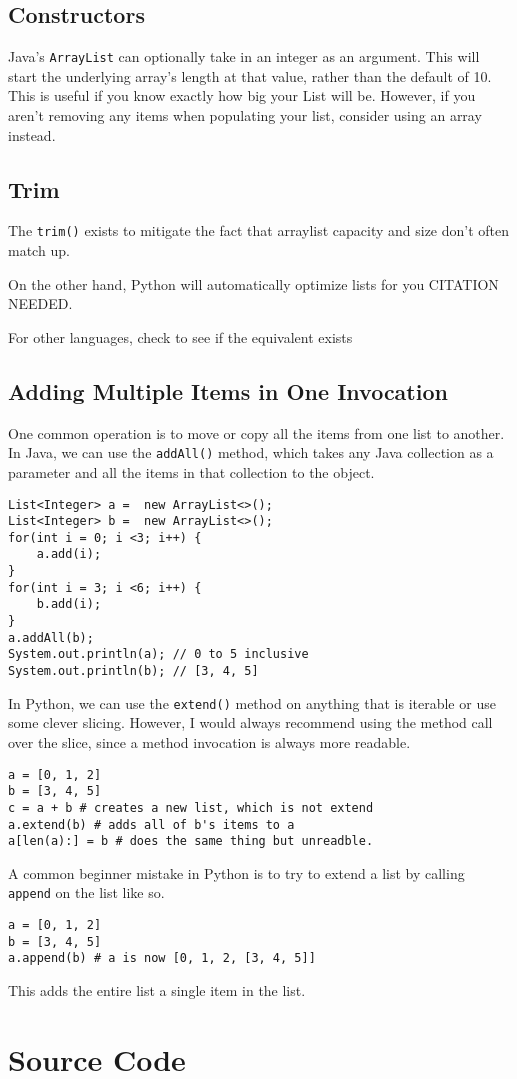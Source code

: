 
\subsection{Constructors}
Java's \texttt{ArrayList} can optionally take in an integer as an argument.
This will start the underlying array's length at that value, rather than the default of 10.
This is useful if you know exactly how big your List will be.  
However, if you aren't removing any items when populating your list, consider using an array instead.

\subsection{Trim}

The \texttt{trim()} exists to mitigate the fact that arraylist capacity and size don't often match up.



On the other hand, Python will automatically optimize lists for you CITATION NEEDED.

For other languages, check to see if the equivalent exists

\subsection{Adding Multiple Items in One Invocation}
One common operation is to move or copy all the items from one list to another.
In Java, we can use the \texttt{addAll()} method, which takes any Java collection as a parameter and all the items in that collection to the object.

\begin{verbatim}
List<Integer> a =  new ArrayList<>();
List<Integer> b =  new ArrayList<>();
for(int i = 0; i <3; i++) { 
	a.add(i); 
}
for(int i = 3; i <6; i++) { 
	b.add(i); 
}
a.addAll(b);
System.out.println(a); // 0 to 5 inclusive
System.out.println(b); // [3, 4, 5]
\end{verbatim}

In Python, we can use the \texttt{extend()} method on anything that is iterable or use some clever slicing.  However, I would always recommend using the method call over the slice, since a method invocation is always more readable.


\begin{verbatim}
a = [0, 1, 2]
b = [3, 4, 5]
c = a + b # creates a new list, which is not extend
a.extend(b) # adds all of b's items to a
a[len(a):] = b # does the same thing but unreadble.
\end{verbatim}
A common beginner mistake in Python is to try to extend a list by calling \texttt{append} on the list like so.

\begin{verbatim}
a = [0, 1, 2]
b = [3, 4, 5]
a.append(b) # a is now [0, 1, 2, [3, 4, 5]]
\end{verbatim}



This adds the entire list a single item in the list.  

\section{Source Code}
\inputminted{python3}{code/arraylist.py}